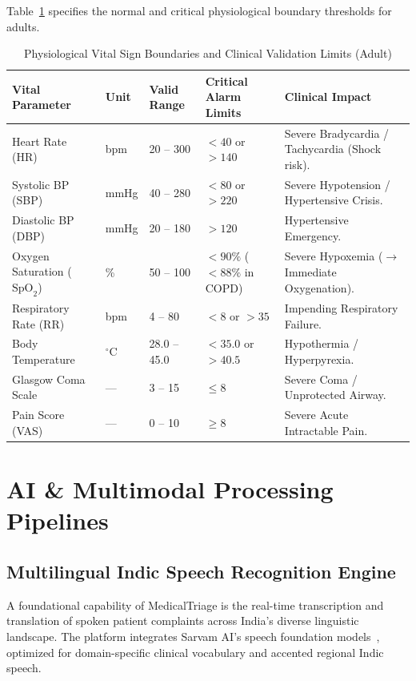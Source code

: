 \documentclass[11pt,a4paper,oneside]{report}
\begin{document}
Table~\ref{tab:vitals_boundaries} specifies the normal and critical physiological boundary thresholds for adults.

\begin{table}[htbp]
  \centering
  \small
  \caption{Physiological Vital Sign Boundaries and Clinical Validation Limits (Adult)}
  \label{tab:vitals_boundaries}
  \begin{tabularx}{\textwidth}{lp{1.6cm}p{2.2cm}p{2.8cm}X}
    \toprule
    \textbf{Vital Parameter} & \textbf{Unit} & \textbf{Valid Range} & \textbf{Critical Alarm Limits} & \textbf{Clinical Impact} \\
    \midrule
    Heart Rate (HR) & bpm & 20 -- 300 & $< 40$ or $> 140$ & Severe Bradycardia / Tachycardia (Shock risk). \\
    Systolic BP (SBP) & mmHg & 40 -- 280 & $< 80$ or $> 220$ & Severe Hypotension / Hypertensive Crisis. \\
    Diastolic BP (DBP) & mmHg & 20 -- 180 & $> 120$ & Hypertensive Emergency. \\
    Oxygen Saturation ($\text{SpO}_2$) & \% & 50 -- 100 & $< 90\%$ ($< 88\%$ in COPD) & Severe Hypoxemia ($\to$ Immediate Oxygenation). \\
    Respiratory Rate (RR) & bpm & 4 -- 80 & $< 8$ or $> 35$ & Impending Respiratory Failure. \\
    Body Temperature & $^\circ\text{C}$ & 28.0 -- 45.0 & $< 35.0$ or $> 40.5$ & Hypothermia / Hyperpyrexia. \\
    Glasgow Coma Scale & --- & 3 -- 15 & $\le 8$ & Severe Coma / Unprotected Airway. \\
    Pain Score (VAS) & --- & 0 -- 10 & $\ge 8$ & Severe Acute Intractable Pain. \\
    \bottomrule
  \end{tabularx}
\end{table}

\chapter{AI \& Multimodal Processing Pipelines}

\section{Multilingual Indic Speech Recognition Engine}
A foundational capability of MedicalTriage is the real-time transcription and translation of spoken patient complaints across India's diverse linguistic landscape. The platform integrates Sarvam AI's speech foundation models~\cite{sarvam2024}, optimized for domain-specific clinical vocabulary and accented regional Indic speech.
\end{document}
